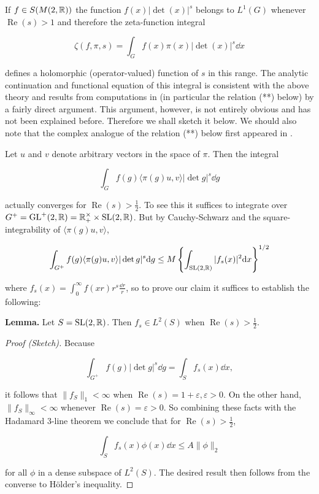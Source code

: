 If $f \in S(M(2, \mathbb{R}))$ the function $f(x)|\det(x)|^s$ belongs to $L^1(G)$ whenever $\operatorname{Re}(s) > 1$ and therefore the zeta-function integral

\[
\zeta(f, \pi, s) = \int_{G} f(x)\pi(x) |\det(x)|^s \dd x
\]

defines a holomorphic (operator-valued) function of $s$ in this range. The analytic continuation and functional equation of this integral is consistent with the above theory and results from computations in \cite{Gelbart} (in particular the relation (**) below) by a fairly direct argument. This argument, however, is not entirely obvious and has not been explained before. Therefore we shall sketch it below. We should also note that the complex analogue of the relation (**) below first appeared in \cite{Stein}.

Let $u$ and $v$ denote arbitrary vectors in the space of $\pi$. Then the integral

\[
\int_{G} f(g)\langle \pi(g)u, v \rangle |\det g|^s \dd g
\]

actually converges for $\operatorname{Re}(s) > \frac{1}{2}$. To see this it suffices to integrate over $G^{+} = \operatorname{GL}^{+}(2, \mathbb{R}) = \mathbb{R}_{+}^{\times} \times \operatorname{SL}(2, \mathbb{R})$. But by Cauchy-Schwarz and the square-integrability of $\langle \pi(g)u, v \rangle$,

\[
\int_{G^{+}} f(g)\langle \pi(g)u, v \rangle |\det g|^s \mathrm{d} g \leq M \left\{\int_{\operatorname{SL}(2, \mathbb{R})} |f_s(x)|^2 \mathrm{d} x \right\}^{1/2}
\]

where $f_s(x) = \int_0^{\infty} f(xr) r^s \frac{\dd r}{r}$, so to prove our claim it suffices to establish the following:

\textbf{Lemma.} Let $S = \operatorname{SL}(2, \mathbb{R})$. Then $f_s \in L^2(S)$ when $\operatorname{Re}(s) > \frac{1}{2}$.

\begin{proof}[Proof (Sketch)]

Because

\[
\int_{G^{+}} f(g)|\det g|^s \dd g = \int_{S} f_s(x) \dd x,
\]

it follows that $\|f_S\|_1 < \infty$ when $\operatorname{Re}(s) = 1 + \varepsilon, \varepsilon > 0$. On the other hand, $\|f_S\|_{\infty} < \infty$ whenever $\operatorname{Re}(s) = \varepsilon > 0$. So combining these facts with the Hadamard 3-line theorem we conclude that for $\operatorname{Re}(s) > \frac{1}{2}$,

\[
\int_{S} f_s(x)\phi(x) \dd x \leq A\|\phi\|_2
\]

for all $\phi$ in a dense subspace of $L^2(S)$. The desired result then follows from the converse to H\"older's inequality.

\end{proof}

